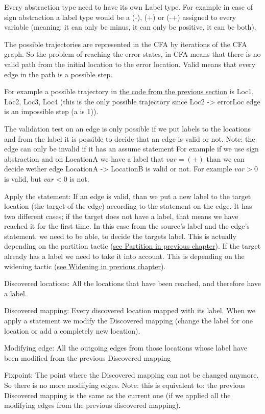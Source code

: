 Every abstraction type need to have its own Label type. For example in case of sign abstraction a label type would be a (-), (+) or (-+) assigned to every variable (meaning: it can only be minus, it can only be positive, it can be both).

The possible trajectories are represented in the CFA by iterations of the CFA graph. So the problem of reaching the error states, in CFA means that there is no valid path from the initial location to the error location. Valid means that every edge in the path is a possible step.

For example a possible trajectory in \hyperref[fig:simpleC]{the code from the previous section} is Loc1, Loc2, Loc3, Loc4 (this is the only possible trajectory since Loc2 -> errorLoc edge is an impossible step (a is 1)).

The validation test on an edge is only possible if we put labels to the locations and from the label it is possible to decide that an edge is valid or not. Note: the edge can only be invalid if it has an assume statement
For example if we use sign abstraction and on LocationA we have a label that $var=(+)$ than we can decide wether edge LocationA -> LocationB is valid or not. For example $var>0$ is valid, but $var<0$ is not.

Apply the statement:
If an edge is valid, than we put a new label to the target location (the target of the edge) according to the statement on the edge.
It has two different cases; if the target does not have a label, that means we have reached it for the first time. In this case from the source's label and the edge's statement, we need to be able, to decide the targets label. This is actually depending on the partition tactic (\hyperref[sec:partition]{see Partition in previous chapter}).
If the target already has a label we need to take it into account. This is depending on the widening tactic (\hyperref[sec:widening]{see Widening in previous chapter}).  

Discovered locations:
All the locations that have been reached, and therefore have a label.

Discovered mapping:
Every discovered location mapped with its label. When we apply a statement we modify the Discovered mapping (change the label for one location or add a completely new location).

Modifying edge:
All the outgoing edges from those locations whose label have been modified from the previous Discovered mapping

Fixpoint:
The point where the Discovered mapping can not be changed anymore. So there is no more modifying edges. Note: this is equivalent to: the previous Discovered mapping is the same as the current one (if we applied all the modifying edges from the previous discovered mapping).

